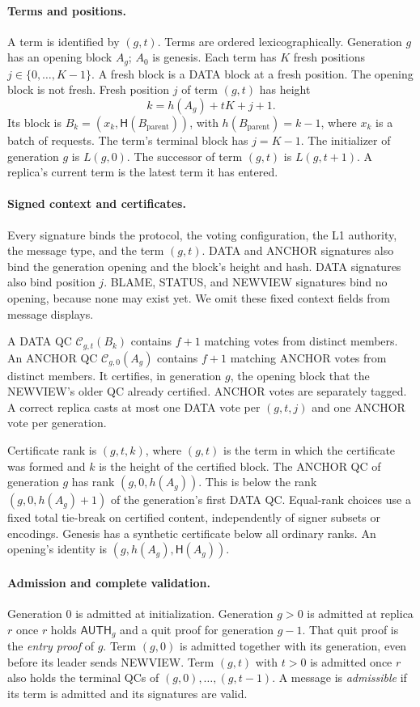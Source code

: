 \documentclass[11pt,a4paper]{article}
\newcommand{\QC}{\mathcal C}
\newcommand{\Hash}{\mathsf H}
\newcommand{\tagg}[1]{\ensuremath{\mathsf{#1}}}
\newcounter{protocol}
\begin{document}
\paragraph{Terms and positions.}
A term is identified by $(g,t)$. Terms are ordered
lexicographically. Generation $g$ has an opening block $A_g$; $A_0$
is genesis. Each term has $K$ fresh positions $j\in\{0,\ldots,K-1\}$.
A fresh block is a DATA block at a fresh position. The opening block is not
fresh. Fresh position $j$ of term $(g,t)$ has height
\[
 k=h(A_g)+tK+j+1.
\]
Its block is $B_k=(x_k,\Hash(B_{\mathrm{parent}}))$, with
$h(B_{\mathrm{parent}})=k-1$, where $x_k$ is a batch of requests.
The term's terminal block has $j=K-1$.
The initializer of generation $g$ is $L(g,0)$. The successor of term
$(g,t)$ is $L(g,t+1)$. A replica's current term is the latest term it has
entered.

\paragraph{Signed context and certificates.}
Every signature binds the protocol, the voting configuration, the L1
authority, the message type, and the term $(g,t)$. DATA and ANCHOR
signatures also bind the generation opening and the block's height and
hash. DATA signatures also bind position $j$. BLAME, STATUS, and NEWVIEW
signatures bind no opening, because none may exist yet.
 We omit these fixed
context fields from message displays.

A DATA QC $\QC_{g,t}(B_k)$ contains $f+1$ matching votes from distinct
members. An ANCHOR QC $\QC_{g,0}(A_g)$ contains $f+1$ matching ANCHOR
votes from distinct members. It certifies, in generation $g$, the opening
block that the NEWVIEW's older QC already certified.
ANCHOR votes are separately tagged. A correct replica casts at most one DATA vote per $(g,t,j)$ and one
ANCHOR vote per generation.

Certificate rank is $(g,t,k)$, where $(g,t)$ is the term in which the
certificate was formed and $k$ is the height of the certified block. The
ANCHOR QC of generation $g$ has rank $(g,0,h(A_g))$. This is below the rank
$(g,0,h(A_g)+1)$ of the generation's first DATA QC.
Equal-rank choices use a fixed total tie-break on certified content,
independently of signer subsets or encodings. Genesis has a synthetic
certificate below all ordinary ranks. An opening's identity is
$(g,h(A_g),\Hash(A_g))$.

\paragraph{Admission and complete validation.}
Generation $0$ is admitted at initialization. Generation $g>0$ is
admitted at replica $r$ once $r$ holds $\tagg{AUTH}_g$ and a quit proof for
generation $g-1$. That quit proof is the \emph{entry proof} of $g$. Term
$(g,0)$ is admitted together with its generation, even before its leader
sends NEWVIEW. Term $(g,t)$ with $t>0$ is admitted once $r$ also holds the
terminal QCs of $(g,0),\ldots,(g,t-1)$. A message is \emph{admissible} if
its term is admitted and its signatures are valid.
\end{document}

